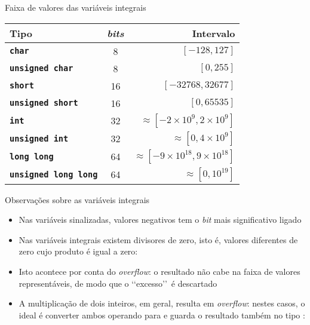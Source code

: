\begin{frame}[fragile]{Faixa de valores das variáveis integrais}

    \begin{table}[!ht]
        \centering

        \begin{tabular}{lcr}
            \toprule
            \textbf{Tipo} & \textit{bits} & \textbf{Intervalo} \\
            \midrule
            \texttt{\textbf{char}} & 8 & $[-128, 127]$ \\
            \rowcolor[gray]{0.9}
            \texttt{\textbf{unsigned char}} & 8 & $[0, 255]$ \\
            \texttt{\textbf{short}} & 16 & $[-32768, 32677]$ \\
            \rowcolor[gray]{0.9}
            \texttt{\textbf{unsigned short}} & 16 & $[0, 65535]$ \\
            \texttt{\textbf{int}} & 32 & $\approx [-2\times 10^9, 2\times 10^9]$ \\
            \rowcolor[gray]{0.9}
            \texttt{\textbf{unsigned int}} & 32 & $\approx [0, 4\times 10^9]$ \\
            \texttt{\textbf{long long}} & 64 & $\approx [-9\times 10^{18}, 9\times 10^{18}]$ \\
            \rowcolor[gray]{0.9}
            \texttt{\textbf{unsigned long long}} & 64 & $\approx [0, 10^{19}]$ \\
            \bottomrule
        \end{tabular}
    \end{table}

\end{frame}

\begin{frame}[fragile]{Observações sobre as variáveis integrais}

    \begin{itemize}
        \item Nas variáveis sinalizadas, valores negativos tem o \textit{bit} mais significativo
            ligado

        \item Nas variáveis integrais existem divisores de zero, isto é, valores diferentes de
            zero cujo produto é igual a zero:

        \item Isto acontece por conta do \textit{overflow}: o resultado não cabe na faixa de
            valores representáveis, de modo que o \lq\lq excesso\rq\rq\ é descartado

        \item A multiplicação de dois inteiros, em geral, resulta em \textit{overflow}: nestes
            casos, o ideal é converter ambos operando para  e guarda o
            resultado também no tipo :
    \end{itemize}

\end{frame}

